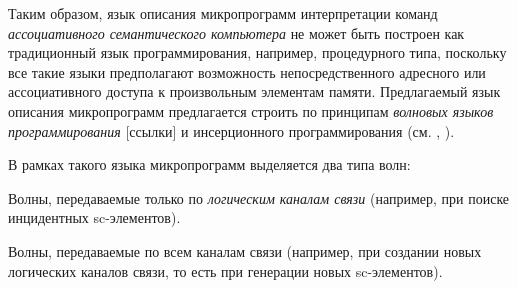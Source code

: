 Таким образом, язык описания микропрограмм интерпретации команд \textit{ассоциативного семантического компьютера} не может быть построен как традиционный язык программирования, например, процедурного типа, поскольку все такие языки предполагают возможность непосредственного адресного или ассоциативного доступа к произвольным элементам памяти. Предлагаемый язык описания микропрограмм предлагается строить по принципам \textit{волновых языков программирования} [ссылки] и инсерционного программирования (см. , ).

В рамках такого языка микропрограмм выделяется два типа волн:
\begin{textitemize}
	\item Волны, передаваемые только по \textit{логическим каналам связи} (например, при поиске инцидентных sc-элементов).
	\item Волны, передаваемые по всем каналам связи (например, при создании новых логических каналов связи, то есть при генерации новых sc-элементов).
\end{textitemize}



